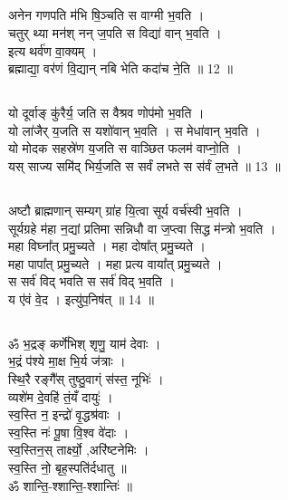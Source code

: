 \subsection{}
अनेन गणपति म॑भि षि॒ञ्चति स वाग्मी भ॒वति ।\\
चतुर् थ्या मन॑श् नन् ज॒पति स विद्या॑ वान् भ॒वति ।\\
इत्य थर्व॑ण वा॒क्यम् । \\
ब्रह्माद्या॒ वर॑णं वि॒द्यान् नबि भेति कदा॑च ने॒ति ॥  12 ॥\\
\subsection{}
यो दूर्वाङ् कु॑रैर्य॒ जति स वैश्रव णोप॑मो भ॒वति ।\\
यो ला॑जैर् य॒जति स यशो॑वान् भ॒वति । स मेधा॑वान् भ॒वति ।\\
यो मोदक सहस्रे॑ण य॒जति स वाञ्छित फलम॑ वाप्नो॒ति ।\\
यस् साज्य समि॑द् भिर्य॒जति स सर्वं लभते स स॑र्वं ल॒भते ॥  13 ॥\\
\subsection{}
अष्टौ ब्राह्मणान् सम्यग् ग्रा॑ह यि॒त्वा सूर्य वर्च॑स्वी भ॒वति ।\\
सूर्यग्रहे म॑हा न॒द्यां प्रतिमा सन्निधौ वा ज॒प्त्वा सिद्ध म॑न्त्रो भ॒वति ।\\
महा विघ्ना᳚त् प्रमु॒च्यते । महा दोषा᳚त् प्रमु॒च्यते ।\\
महा पापा᳚त् प्रमु॒च्यते । महा प्रत्य वाया᳚त् प्रमु॒च्यते ।\\
स सर्व॑ विद् भवति स सर्व॑ विद् भ॒वति ।\\
य ए॑वं वे॒द । इत्यु॑प॒निष॑त् ॥ 14 ॥\\
\subsection{}
ॐ भ॒द्रङ् कर्णे॑भिश् शृणु॒ याम॑ देवाः ।\\
भ॒द्रं प॑श्ये मा॒क्ष भि॒र्य ज॑त्राः ।\\
स्थि॒रै रङ्गै᳚स् तुष्ठु॒वाग्ं स॑स्त॒ नूभिः॑ ।\\
व्यशे॑म दे॒वहि॑ तं॒यँ दायुः॑ ।\\
स्व॒स्ति न॒ इन्द्रो॑ वृ॒द्धश्र॑वाः ।\\
स्व॒स्ति नः॑ पू॒षा वि॒श्व वे॑दाः ।\\
स्व॒स्तिन॒स् तार्क्ष्यो॒ ,अरि॑ष्टनेमिः ।\\
स्व॒स्ति नो॒ बृह॒स्पति॑र्दधातु ॥\\
ॐ शान्ति॒-श्शान्ति॒-श्शान्तिः॑ ॥\\
